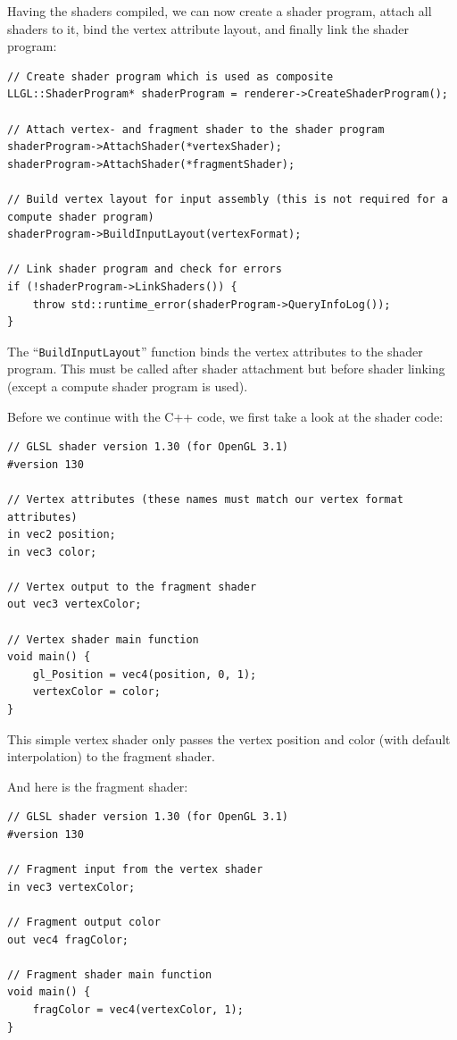 \documentclass{article}
\begin{document}
Having the shaders compiled, we can now create a shader program, attach all shaders to it,
bind the vertex attribute layout, and finally link the shader program:
\begin{lstlisting}
// Create shader program which is used as composite
LLGL::ShaderProgram* shaderProgram = renderer->CreateShaderProgram();

// Attach vertex- and fragment shader to the shader program
shaderProgram->AttachShader(*vertexShader);
shaderProgram->AttachShader(*fragmentShader);

// Build vertex layout for input assembly (this is not required for a compute shader program)
shaderProgram->BuildInputLayout(vertexFormat);

// Link shader program and check for errors
if (!shaderProgram->LinkShaders()) {
    throw std::runtime_error(shaderProgram->QueryInfoLog());
}
\end{lstlisting}
The ``\texttt{BuildInputLayout}'' function binds the vertex attributes to the shader program.
This must be called after shader attachment but before shader linking (except a compute shader program is used).

Before we continue with the C++ code, we first take a look at the shader code:
\begin{lstlisting}[title={\texttt{vertex.glsl}}]
// GLSL shader version 1.30 (for OpenGL 3.1)
#version 130

// Vertex attributes (these names must match our vertex format attributes)
in vec2 position;
in vec3 color;

// Vertex output to the fragment shader
out vec3 vertexColor;

// Vertex shader main function
void main() {
    gl_Position = vec4(position, 0, 1);
    vertexColor = color;
}
\end{lstlisting}
This simple vertex shader only passes the vertex position and color (with default interpolation) to the fragment shader.

\newpage
\noindent
And here is the fragment shader:
\begin{lstlisting}[title={\texttt{fragment.glsl}}]
// GLSL shader version 1.30 (for OpenGL 3.1)
#version 130

// Fragment input from the vertex shader
in vec3 vertexColor;

// Fragment output color
out vec4 fragColor;

// Fragment shader main function
void main() {
    fragColor = vec4(vertexColor, 1);
}
\end{lstlisting}
\end{document}
